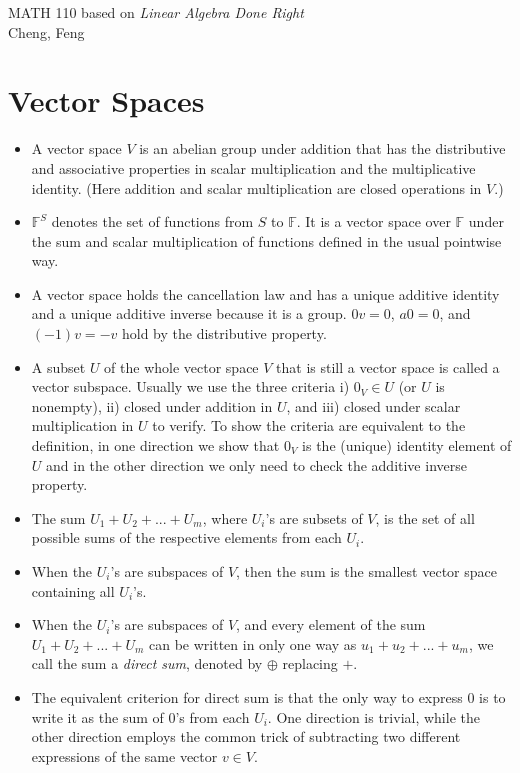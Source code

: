\documentclass{article}
\newcommand{\F}{\mathbb{F}}
\begin{document}
\begin{center}
    {\Large MATH 110 based on \textit{Linear Algebra Done Right}} \vspace{0.5em}
    \\ Cheng, Feng
    \vspace{-0.5em}
\end{center}

\section{Vector Spaces}
\begin{itemize}
    \item A vector space $V$ is an abelian group under addition that has the distributive and associative properties in scalar multiplication and the multiplicative identity. (Here addition and scalar multiplication are closed operations in $V$.)
    \item $\F^S$ denotes the set of functions from $S$ to $\F$. It is a vector space over $\F$ under the sum and scalar multiplication of functions defined in the usual pointwise way.
    \item A vector space holds the cancellation law and has a unique additive identity and a unique additive inverse because it is a group. $0v = 0$, $a0 = 0$, and $(-1)v = -v$ hold by the distributive property.
    \item A subset $U$ of the whole vector space $V$ that is still a vector space is called a vector subspace. Usually we use the three criteria i) $0_V \in U$ (or $U$ is nonempty), ii) closed under addition in $U$, and iii) closed under scalar multiplication in $U$ to verify. To show the criteria are equivalent to the definition, in one direction we show that $0_V$ is the (unique) identity element of $U$ and in the other direction we only need to check the additive inverse property.
    \item The sum $U_1 + U_2 +...+ U_m$, where $U_i$'s are subsets of $V$, is the set of all possible sums of the respective elements from each $U_i$.
    \item When the $U_i$'s are subspaces of $V$, then the sum is the smallest vector space containing all $U_i$'s.
    \item When the $U_i$'s are subspaces of $V$, and every element of the sum $U_1 + U_2 +...+ U_m$ can be written in only one way as $u_1+u_2+...+u_m$, we call the sum a \textit{direct sum}, denoted by $\oplus$ replacing $+$.
    \item The equivalent criterion for direct sum is that the only way to express $0$ is to write it as the sum of $0$'s from each $U_i$. One direction is trivial, while the other direction employs the common trick of subtracting two different expressions of the same vector $v \in V$.

\end{itemize}
\end{document}
